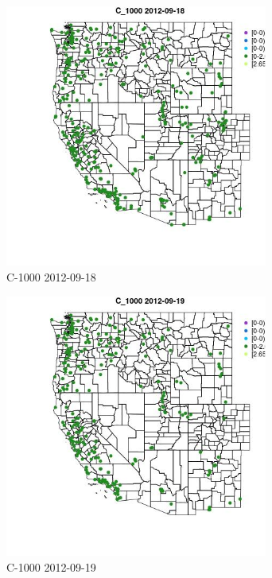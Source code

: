 \begin{figure} 
\centering  
\includegraphics[width=0.77\textwidth]{Code_Outputs/ML_input_report_ML_input_PM25_Step5_part_d_de_duplicated_aves_ML_input_MapObsC_10002012-09-18.jpg} 
\caption{\label{fig:ML_input_report_ML_input_PM25_Step5_part_d_de_duplicated_aves_ML_inputMapObsC_10002012-09-18}C-1000 2012-09-18} 
\end{figure} 
 

\begin{figure} 
\centering  
\includegraphics[width=0.77\textwidth]{Code_Outputs/ML_input_report_ML_input_PM25_Step5_part_d_de_duplicated_aves_ML_input_MapObsC_10002012-09-19.jpg} 
\caption{\label{fig:ML_input_report_ML_input_PM25_Step5_part_d_de_duplicated_aves_ML_inputMapObsC_10002012-09-19}C-1000 2012-09-19} 
\end{figure} 
 

